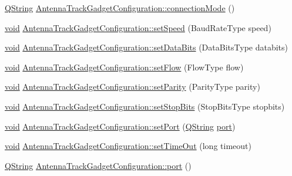 \begin{DoxyCompactItemize}
\item 
\hyperlink{group___u_a_v_objects_plugin_gab9d252f49c333c94a72f97ce3105a32d}{\-Q\-String} \hyperlink{group___antenna_track_gadget_plugin_ga016616d69e43834c0b010babbbb20b04}{\-Antenna\-Track\-Gadget\-Configuration\-::connection\-Mode} ()
\item 
\hyperlink{group___u_a_v_objects_plugin_ga444cf2ff3f0ecbe028adce838d373f5c}{void} \hyperlink{group___antenna_track_gadget_plugin_ga657a8ae2f677f817ea6378959145290c}{\-Antenna\-Track\-Gadget\-Configuration\-::set\-Speed} (\-Baud\-Rate\-Type speed)
\item 
\hyperlink{group___u_a_v_objects_plugin_ga444cf2ff3f0ecbe028adce838d373f5c}{void} \hyperlink{group___antenna_track_gadget_plugin_ga36f5c3e37039cfa6f3ea79d53339db3f}{\-Antenna\-Track\-Gadget\-Configuration\-::set\-Data\-Bits} (\-Data\-Bits\-Type databits)
\item 
\hyperlink{group___u_a_v_objects_plugin_ga444cf2ff3f0ecbe028adce838d373f5c}{void} \hyperlink{group___antenna_track_gadget_plugin_gab8a02ca68afcbac2db3db1df1f777695}{\-Antenna\-Track\-Gadget\-Configuration\-::set\-Flow} (\-Flow\-Type flow)
\item 
\hyperlink{group___u_a_v_objects_plugin_ga444cf2ff3f0ecbe028adce838d373f5c}{void} \hyperlink{group___antenna_track_gadget_plugin_gae386222c5ab2b4132f1f09afd058f48f}{\-Antenna\-Track\-Gadget\-Configuration\-::set\-Parity} (\-Parity\-Type parity)
\item 
\hyperlink{group___u_a_v_objects_plugin_ga444cf2ff3f0ecbe028adce838d373f5c}{void} \hyperlink{group___antenna_track_gadget_plugin_ga35eed481804afdc5eaff1273278718f2}{\-Antenna\-Track\-Gadget\-Configuration\-::set\-Stop\-Bits} (\-Stop\-Bits\-Type stopbits)
\item 
\hyperlink{group___u_a_v_objects_plugin_ga444cf2ff3f0ecbe028adce838d373f5c}{void} \hyperlink{group___antenna_track_gadget_plugin_gac2bdc7b975f53784d49e7d2bb484742e}{\-Antenna\-Track\-Gadget\-Configuration\-::set\-Port} (\hyperlink{group___u_a_v_objects_plugin_gab9d252f49c333c94a72f97ce3105a32d}{\-Q\-String} \hyperlink{classport}{port})
\item 
\hyperlink{group___u_a_v_objects_plugin_ga444cf2ff3f0ecbe028adce838d373f5c}{void} \hyperlink{group___antenna_track_gadget_plugin_gacf4c8b3c4cbd9235d1e80ddb544194f3}{\-Antenna\-Track\-Gadget\-Configuration\-::set\-Time\-Out} (long timeout)
\item 
\hyperlink{group___u_a_v_objects_plugin_gab9d252f49c333c94a72f97ce3105a32d}{\-Q\-String} \hyperlink{group___antenna_track_gadget_plugin_ga191565f9ae925e1b1b00f3b51254d102}{\-Antenna\-Track\-Gadget\-Configuration\-::port} ()

\end{DoxyCompactItemize}
